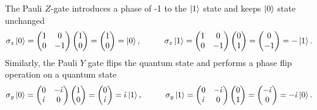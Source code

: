 \documentclass[10pt]{article}
\begin{document}
	The Pauli $Z$-gate introduces a phase of -1 to the $\ket{1}$ state and keeps $\ket{0}$ state unchanged
	\begin{equation}
		\sigma_{z}\ket{0}=\begin{pmatrix}
			1&0\\
			0&-1
		\end{pmatrix}\begin{pmatrix}
			1\\0
		\end{pmatrix}=\begin{pmatrix}
			1\\0
		\end{pmatrix}=\ket{0}, \hspace{1cm}
		\sigma_{z}\ket{1}=\begin{pmatrix}
			1&0\\
			0&-1
		\end{pmatrix}\begin{pmatrix}
			0\\1
		\end{pmatrix}=\begin{pmatrix}
			0\\-1
		\end{pmatrix}=-\ket{1}.
	\end{equation}
	Similarly, the Pauli $Y$ gate flips the quantum state and performs a phase flip operation on a quantum state 
	\begin{equation}
		\sigma_{y}\ket{0}=\begin{pmatrix}
			0&-\dot{\iota}\\
			\dot{\iota}&0
		\end{pmatrix}\begin{pmatrix}
			1\\0
		\end{pmatrix}=\begin{pmatrix}
			0\\\dot{\iota}
		\end{pmatrix}=\dot{\iota}\ket{1}, \hspace{1cm}
		\sigma_{y}\ket{1}=\begin{pmatrix}
			0&-\dot{\iota}\\
			\dot{\iota}&0
		\end{pmatrix}\begin{pmatrix}
			0\\1
		\end{pmatrix}=\begin{pmatrix}
			-\dot{\iota}\\0
		\end{pmatrix}=-\dot{\iota}\ket{0}.
	\end{equation}
\end{document}
